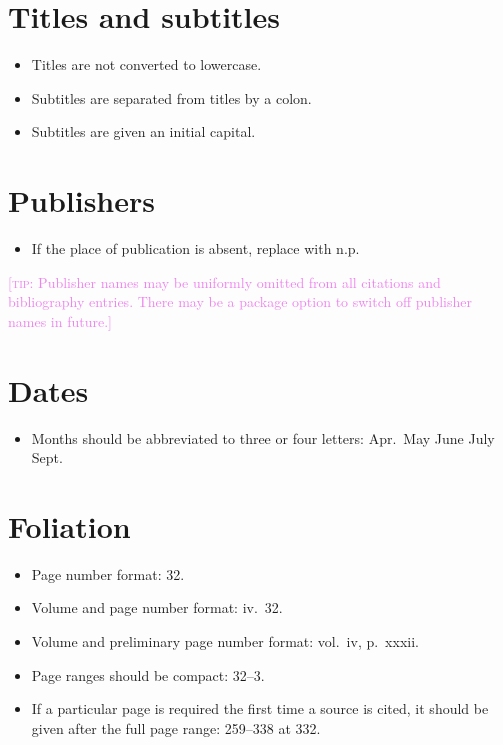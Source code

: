 \documentclass[extrafontsizes,11pt,a4paper,oneside]{memoir}
\newcommand*{\aside}[1]{\textcolor{violet}{[\textsc{tip:} #1]}}
\begin{document}
\section{Titles and subtitles}

\begin{itemize}
  \item Titles are not converted to lowercase.
  
  \item Subtitles are separated from titles by a colon.
  
  \item Subtitles are given an initial capital.
  \par{}
\end{itemize}

\section{Publishers}

\begin{itemize}
  \item If the place of publication is absent, replace with n.p.
\end{itemize}

\aside{Publisher names may be uniformly omitted from all citations and bibliography entries. There may be a package option to switch off publisher names in future.}

\section{Dates}

\begin{itemize}
  \item Months should be abbreviated to three or four letters: Apr.\ May June July Sept. %
\end{itemize}

\section{Foliation}

\begin{itemize}
  \item Page number format: 32.
  \item Volume and page number format: iv.\ 32.
  \item Volume and preliminary page number format: vol.\ iv, p.\ xxxii.
  \item Page ranges should be compact: 32--3.\\
  \item If a particular page is required the first time a source is cited, it should be given after the full page range: 259--338 at 332.\\
\end{itemize}
\end{document}
